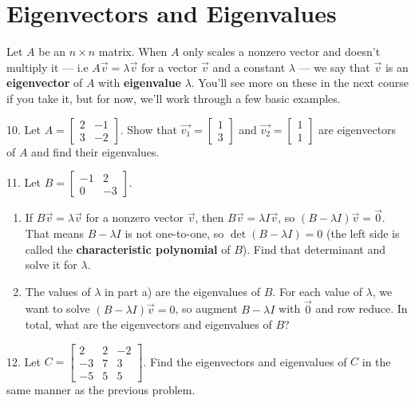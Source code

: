 \documentclass{article}
\begin{document}
\section{Eigenvectors and Eigenvalues}

Let $A$ be an $n \times n$ matrix. When $A$ only scales a nonzero vector and doesn't multiply it --- i.e $A\vec{v} = \lambda\vec{v}$ for a vector $\vec{v}$ and a constant $\lambda$ --- we say that $\vec{v}$ is an \textbf{eigenvector} of $A$ with \textbf{eigenvalue} $\lambda$. You'll see more on these in the next course if you take it, but for now, we'll work through a few basic examples.

10. Let $\displaystyle A = \left[\begin{array}{cc} 2& -1 \\ 3& -2 \end{array}\right]$. Show that $\vec{v_1} = \left[\begin{array}{c} 1 \\ 3 \end{array}\right]$ and $\vec{v_2} = \left[\begin{array}{c} 1 \\ 1 \end{array}\right]$ are eigenvectors of $A$ and find their eigenvalues.

11. Let $B = \left[\begin{array}{cc} -1& 2 \\ 0& -3 \end{array}\right]$.

\begin{enumerate}

	\item If $B\vec{v} = \lambda\vec{v}$ for a nonzero vector $\vec{v}$, then $B\vec{v} = \lambda I \vec{v}$, so $(B - \lambda I)\vec{v} = \vec{0}$. That means $B - \lambda I$ is not one-to-one, so $\det (B - \lambda I) = 0$ (the left side is called the \textbf{characteristic polynomial} of $B$). Find that determinant and solve it for $\lambda$.

	\item The values of $\lambda$ in part a) are the eigenvalues of $B$. For each value of $\lambda$, we want to solve $(B - \lambda I)\vec{v} = 0$, so augment $B - \lambda I$ with $\vec{0}$ and row reduce. In total, what are the eigenvectors and eigenvalues of $B$?

\end{enumerate}

12. Let $C = \left[\begin{array}{ccc} 2& 2& -2 \\ -3& 7& 3 \\ -5& 5& 5 \end{array}\right]$. Find the eigenvectors and eigenvalues of $C$ in the same manner as the previous problem.
\end{document}
